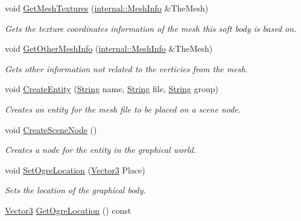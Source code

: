 \begin{DoxyCompactItemize}
void \hyperlink{classphys_1_1ActorBase_a91c1bd400e1cf0e35682a506aebb7f38}{GetMeshTextures} (\hyperlink{structphys_1_1internal_1_1MeshInfo}{internal::MeshInfo} \&TheMesh)
\begin{DoxyCompactList}\small\item\em Gets the texture coordinates information of the mesh this soft body is based on. \item\end{DoxyCompactList}\item 
void \hyperlink{classphys_1_1ActorBase_a1ca4a67351c3d7375a62223d12729776}{GetOtherMeshInfo} (\hyperlink{structphys_1_1internal_1_1MeshInfo}{internal::MeshInfo} \&TheMesh)
\begin{DoxyCompactList}\small\item\em Gets other information not related to the verticies from the mesh. \item\end{DoxyCompactList}\item 
void \hyperlink{classphys_1_1ActorBase_aff7dbb190fb982a43123bee3066501c4}{CreateEntity} (\hyperlink{namespacephys_aa03900411993de7fbfec4789bc1d392e}{String} name, \hyperlink{namespacephys_aa03900411993de7fbfec4789bc1d392e}{String} file, \hyperlink{namespacephys_aa03900411993de7fbfec4789bc1d392e}{String} group)
\begin{DoxyCompactList}\small\item\em Creates an entity for the mesh file to be placed on a scene node. \item\end{DoxyCompactList}\item 
void \hyperlink{classphys_1_1ActorBase_a125d6f0a0b4072e64490638c074eea2d}{CreateSceneNode} ()
\begin{DoxyCompactList}\small\item\em Creates a node for the entity in the graphical world. \item\end{DoxyCompactList}\item 
void \hyperlink{classphys_1_1ActorBase_a192ced7c3191f3f9d4921aad73952046}{SetOgreLocation} (\hyperlink{classphys_1_1Vector3}{Vector3} Place)
\begin{DoxyCompactList}\small\item\em Sets the location of the graphical body. \item\end{DoxyCompactList}\item 
\hyperlink{classphys_1_1Vector3}{Vector3} \hyperlink{classphys_1_1ActorBase_a12ef0a2625e2fdf506ea8e23e0a378fa}{GetOgreLocation} () const 

\end{DoxyCompactItemize}
